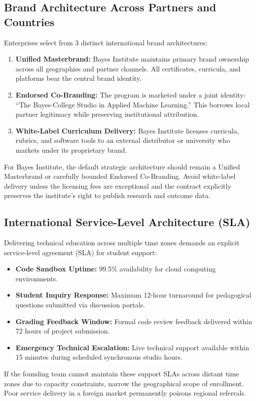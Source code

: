 \subsection{Brand Architecture Across Partners and Countries}
\label{sec:brand_architecture_across_partners}

Enterprises select from 3 distinct international brand architectures:
\begin{enumerate}
\item \textbf{Unified Masterbrand:} Bayes Institute maintains primary brand ownership across all geographies and partner channels. All certificates, curricula, and platforms bear the central brand identity.
\item \textbf{Endorsed Co-Branding:} The program is marketed under a joint identity: ``The Bayes-College Studio in Applied Machine Learning.'' This borrows local partner legitimacy while preserving institutional attribution.
\item \textbf{White-Label Curriculum Delivery:} Bayes Institute licenses curricula, rubrics, and software tools to an external distributor or university who markets under its proprietary brand.
\end{enumerate}
For Bayes Institute, the default strategic architecture should remain a Unified Masterbrand or carefully bounded Endorsed Co-Branding. Avoid white-label delivery unless the licensing fees are exceptional and the contract explicitly preserves the institute's right to publish research and outcome data.

\subsection{International Service-Level Architecture (SLA)}
\label{sec:international_sla_architecture}

Delivering technical education across multiple time zones demands an explicit service-level agreement (SLA) for student support:
\begin{itemize}
\item \textbf{Code Sandbox Uptime:} 99.5\% availability for cloud computing environments.
\item \textbf{Student Inquiry Response:} Maximum 12-hour turnaround for pedagogical questions submitted via discussion portals.
\item \textbf{Grading Feedback Window:} Formal code review feedback delivered within 72 hours of project submission.
\item \textbf{Emergency Technical Escalation:} Live technical support available within 15 minutes during scheduled synchronous studio hours.
\end{itemize}
If the founding team cannot maintain these support SLAs across distant time zones due to capacity constraints, narrow the geographical scope of enrollment. Poor service delivery in a foreign market permanently poisons regional referrals.

